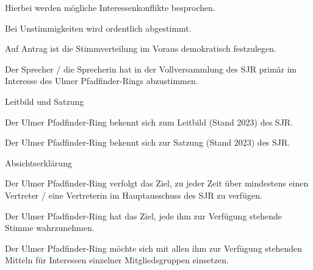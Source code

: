 \begin{legal}
\begin{legal}
\begin{legal}
                    \item Hierbei werden mögliche Interessenkonflikte besprochen.
                        \begin{legal}
                            \item Bei Unstimmigkeiten wird ordentlich abgestimmt.
                        \end{legal}
                    \item Auf Antrag ist die Stimmverteilung im Voraus demokratisch festzulegen.
                    \item Der Sprecher / die Sprecherin hat in der Vollversammlung des SJR primär im 
                          Interesse des Ulmer Pfadfinder-Rings abzustimmen.
                \end{legal}
            \item Leitbild und Satzung
                \begin{legal}
                    \item Der Ulmer Pfadfinder-Ring bekennt sich zum Leitbild (Stand 2023) des SJR.
                    \item Der Ulmer Pfadfinder-Ring bekennt sich zur Satzung (Stand 2023) des SJR.
                \end{legal}
        \end{legal}
    \item Absichtserklärung
        \begin{legal}
            \item Der Ulmer Pfadfinder-Ring verfolgt das Ziel, zu jeder Zeit über mindestens einen 
                  Vertreter / eine Vertreterin im Hauptausschuss des SJR zu verfügen.
            \item Der Ulmer Pfadfinder-Ring hat das Ziel, jede ihm zur Verfügung stehende Stimme 
                  wahrzunehmen.
            \item Der Ulmer Pfadfinder-Ring möchte sich mit allen ihm zur Verfügung stehenden 
                  Mitteln für Interessen einzelner Mitgliedsgruppen einsetzen.
        \end{legal}
\end{legal}
